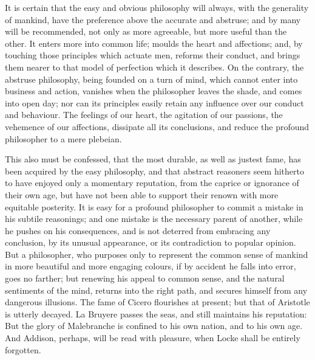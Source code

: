 \documentclass[]{article}
\begin{document}
\begin{sectionbody}
\humeparagraph  It is certain that the easy and obvious philosophy will always, with the generality of mankind, have the preference above the accurate and abstruse; and by many will be recommended, not only as more agreeable, but more useful than the other. It enters more into common life; moulds the heart and affections; and, by touching those principles which actuate men, reforms their conduct, and brings them nearer to that model of perfection which it describes. On the contrary, the abstruse philosophy, being founded on a turn of mind, which cannot enter into business and action, vanishes when the philosopher leaves the shade, and comes into open day; nor can its principles easily retain any influence over our conduct and behaviour. The feelings of our heart, the agitation of our passions, the vehemence of our affections, dissipate all its conclusions, and reduce the profound philosopher to a mere plebeian.

\humeparagraph  This also must be confessed, that the most durable, as well as justest fame, has been acquired by the easy philosophy, and that abstract reasoners seem hitherto to have enjoyed only a momentary reputation, from the caprice or ignorance of their own age, but have not been able to support their renown with more equitable posterity. It is easy for a profound philosopher to commit a mistake in his subtile reasonings; and one mistake is the necessary parent of another, while he pushes on his consequences, and is not deterred from embracing any conclusion, by its unusual appearance, or its contradiction to popular opinion. But a philosopher, who purposes only to represent the common sense of mankind in more beautiful and more engaging colours, if by accident he falls into error, goes no farther; but renewing his appeal to common sense, and the natural sentiments of the mind, returns into the right path, and secures himself from any dangerous illusions. The fame of Cicero flourishes at present; but that of Aristotle is utterly decayed. La Bruyere passes the seas, and still maintains his reputation: But the glory of Malebranche is confined to his own nation, and to his own age. And Addison, perhaps, will be read with pleasure, when Locke shall be entirely forgotten.


\end{sectionbody}
\end{document}
